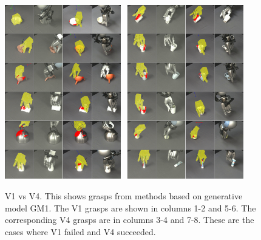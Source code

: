 \begin{figure}
\begin{center}
\includegraphics[width=0.45\textwidth]{plots/A2fA9s_1_vertical}~
\includegraphics[width=0.45\textwidth]{plots/A2fA9s_2_vertical}
\caption{V1 vs V4. This shows grasps from methods based on generative model GM1. The V1 grasps are shown in columns 1-2 and 5-6. The corresponding V4 grasps are in columns 3-4 and 7-8. These are the cases where V1 failed and V4 succeeded.\label{fig:v1fv4s}}
\end{center}
\end{figure}


